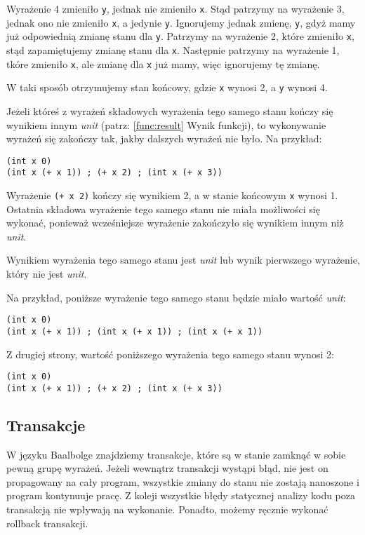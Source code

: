 \documentclass{article}
\begin{document}
Wyrażenie 4 zmieniło \texttt{y}, jednak nie zmieniło \texttt{x}. Stąd patrzymy na wyrażenie 3, jednak ono nie zmieniło \texttt{x}, a jedynie \texttt{y}. Ignorujemy jednak zmienę, \texttt{y}, gdyż mamy już odpowiednią zmianę stanu dla \texttt{y}. Patrzymy na wyrażenie 2, które zmieniło \texttt{x}, stąd zapamiętujemy zmianę stanu dla \texttt{x}. Następnie patrzymy na wyrażenie 1, tkóre zmieniło \texttt{x}, ale zmianę dla \texttt{x} już mamy, więc ignorujemy tę zmianę.

W taki sposób otrzymujemy stan końcowy, gdzie \texttt{x} wynosi 2, a \texttt{y} wynosi 4.

Jeżeli któreś z wyrażeń składowych wyrażenia tego samego stanu kończy się wynikiem innym \textit{unit} (patrz: \ref{func:result} Wynik funkcji), to wykonywanie wyrażeń się zakończy tak, jakby dalszych wyrażeń nie było. Na przykład:

\begin{lstlisting}
(int x 0)
(int x (+ x 1)) ; (+ x 2) ; (int x (+ x 3))
\end{lstlisting}

Wyrażenie \texttt{(+ x 2)} kończy się wynikiem 2, a w stanie końcowym \texttt{x} wynosi 1. Ostatnia składowa wyrażenie tego samego stanu nie miała możliwości się wykonać, ponieważ wcześniejsze wyrażenie zakończyło się wynikiem innym niż \textit{unit}.

Wynikiem wyrażenia tego samego stanu jest \textit{unit} lub wynik pierwszego wyrażenie, który nie jest \textit{unit}.

Na przykład, poniższe wyrażenie tego samego stanu będzie miało wartość \textit{unit}:

\begin{lstlisting}
(int x 0)
(int x (+ x 1)) ; (int x (+ x 1)) ; (int x (+ x 1))
\end{lstlisting}

Z drugiej strony, wartość poniższego wyrażenia tego samego stanu wynosi 2:

\begin{lstlisting}
(int x 0)
(int x (+ x 1)) ; (+ x 2) ; (int x (+ x 3))
\end{lstlisting}

\subsection{Transakcje}\label{trans}

W języku Baalbolge znajdziemy transakcje, które są w stanie zamknąć w sobie pewną grupę wyrażeń. Jeżeli wewnątrz transakcji wystąpi błąd, nie jest on propagowany na cały program, wszystkie zmiany do stanu nie zostają nanoszone i program kontynuuje pracę. Z koleji wszystkie błędy statycznej analizy kodu poza transakcją nie wpływają na wykonanie. Ponadto, możemy ręcznie wykonać rollback transakcji.
\end{document}
